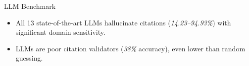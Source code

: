 \begin{keyfindingsSidebar}{LLM Benchmark}
\begin{itemize}
	\setlength{\itemsep}{0pt}
    \setlength{\topsep}{0pt}
    \setlength{\partopsep}{0pt}
    \setlength{\parsep}{0pt}
	\item All 13 state-of-the-art LLMs hallucinate citations (\textit{14.23--94.93\%}) with significant domain sensitivity.
	\item LLMs are poor citation validators (\textit{38\%} accuracy), even lower than random guessing.
\end{itemize}
\end{keyfindingsSidebar}